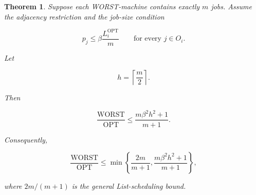 \documentclass[11pt]{article}
\newtheorem{theorem}{Theorem}
\newcommand{\OPT}{\mathrm{OPT}}
\newcommand{\WORST}{\mathrm{WORST}}
\begin{document}
\begin{theorem}
Suppose each WORST-machine contains exactly \(m\) jobs. Assume the adjacency restriction
and the job-size condition

\[
p_j\le \beta \frac{L_i^{\OPT}}{m}
\qquad
\text{for every } j\in O_i.
\]

Let

\[
h=\left\lceil \frac m2\right\rceil .
\]

Then

\[
\frac{\WORST}{\OPT}
\le
\frac{m\beta^2 h^2+1}{m+1}.
\]

Consequently,

\[
\frac{\WORST}{\OPT}
\le
\min\left\{
\frac{2m}{m+1},
\frac{m\beta^2 h^2+1}{m+1}
\right\},
\]

where \(2m/(m+1)\) is the general List-scheduling bound.
\end{theorem}
\end{document}
